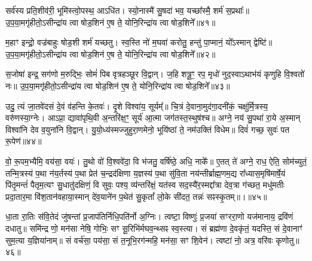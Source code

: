 {\anuvakamend[{असा॑वि स॒प्तविꣳ॑शतिः॥39॥}]}

सर्व॑स्य प्रति॒शीव॑री॒ भूमि॑स्त्वो॒पस्थ॒ आ\-ऽधि॑त। स्यो॒नास्मै॑ सु॒षदा॑ भव॒ यच्छा᳚स्मै॒ शर्म॑ स॒प्रथाः᳚॥ उ॒प॒या॒मगृ॑हीतो॒\-ऽसीन्द्रा॑य त्वा षोड॒शिन॑ ए॒ष ते॒ योनि॒रिन्द्रा॑य त्वा षोड॒शिने᳚॥४१॥

{\anuvakamend[{सर्व॑स्य॒ षड्विꣳ॑शतिः॥40॥}]}

म॒हाꣳ इन्द्रो॒ वज्र॑बाहुः षोड॒शी शर्म॑ यच्छतु। स्व॒स्ति नो॑ म॒घवा॑ करोतु॒ हन्तु॑ पा॒प्मानं॒ यो᳚\-ऽस्मान् द्वेष्टि॑॥ उ॒प॒या॒मगृ॑हीतो॒\-ऽसीन्द्रा॑य त्वा षोड॒शिन॑ ए॒ष ते॒ योनि॒रिन्द्रा॑य त्वा षोड॒शिने᳚॥४२॥

{\anuvakamend[{सर्व॑स्य म॒हान्थ्षड्विꣳ॑शति॒ष्षड्विꣳ॑शतिः॥41॥}]}

स॒जोषा॑ इन्द्र॒ सग॑णो म॒रुद्भिः॒ सोमं॑ पिब वृत्रहञ्छूर वि॒द्वान्। ज॒हि शत्रू॒ꣳ॒ रप॒ मृधो॑ नुद॒स्वा\-ऽथाभ॑यं कृणुहि वि॒श्वतो॑ नः॥ उ॒प॒या॒मगृ॑हीतो॒\-ऽसीन्द्रा॑य त्वा षोड॒शिन॑ ए॒ष ते॒ योनि॒रिन्द्रा॑य त्वा षोड॒शिने᳚॥४३॥

{\anuvakamend[{स॒जोषा᳚स्त्रि॒ꣳ॒शत्॥42॥}]}

उदु॒ त्यं जा॒तवे॑दसं दे॒वं व॑हन्ति के॒तवः॑। दृ॒शे विश्वा॑य॒ सूर्यम्᳚॥ चि॒त्रं दे॒वाना॒मुद॑गा॒दनी॑कं॒ चक्षु॑र्मि॒त्रस्य॒ वरु॑णस्या॒ग्नेः। आ\-ऽप्रा॒ द्यावा॑पृथि॒वी अ॒न्तरि॑क्ष॒ꣳ॒ सूर्य॑ आ॒त्मा जग॑तस्त॒स्थुष॑श्च॥ अग्ने॒ नय॑ सु॒पथा॑ रा॒ये अ॒स्मान् विश्वा॑नि देव व॒युना॑नि वि॒द्वान्। यु॒यो॒ध्य॑स्मज्जुहुरा॒णमेनो॒ भूयि॑ष्ठां ते॒ नम॑उक्तिं विधेम॥ दिवं॑ गच्छ॒ सुवः॑ पत रू॒पेण॑॥४४॥

वो॒ रू॒पम॒भ्यैमि॒ वय॑सा॒ वयः॑। तु॒थो वो॑ वि॒श्ववे॑दा॒ वि भ॑जतु॒ वर्\mbox{}षि॑ष्ठे॒ अधि॒ नाके᳚॥ ए॒तत् ते॑ अग्ने॒ राध॒ ऐति॒ सोम॑च्युतं॒ तन्मि॒त्रस्य॑ प॒था न॑य॒र्तस्य॑ प॒था प्रेत॑ च॒न्द्रद॑क्षिणा य॒ज्ञस्य॑ प॒था सु॑वि॒ता नय॑न्तीर्ब्राह्म॒णम॒द्य रा᳚ध्यास॒मृषि॑मार्\mbox{}षे॒यं पि॑तृ॒मन्तं॑ पैतृम॒त्यꣳ सु॒धातु॑दक्षिणं॒ वि सुवः॒ पश्य॒ व्य॑न्तरि॑क्षं॒ यत॑स्व सद॒स्यै॑र॒स्मद्दा᳚त्रा देव॒त्रा ग॑च्छत॒ मधु॑मतीः प्रदा॒तार॒मा वि॑श॒तान॑वहाया॒स्मान् दे॑व॒याने॑न प॒थेत॑ सु॒कृतां᳚ लो॒के सी॑दत॒ तन्नः॑ सꣴस्कृ॒तम्॥।॥४५॥

{\anuvakamend[{रू॒पेण॑ सद॒स्यै॑र॒ष्टाद॑श च॥43 (37)॥}]}

धा॒ता रा॒तिः स॑वि॒तेदं जु॑षन्तां प्र॒जाप॑तिर्निधि॒पति॑र्नो अ॒ग्निः। त्वष्टा॒ विष्णुः॑ प्र॒जया॑ सꣳररा॒णो यज॑मानाय॒ द्रवि॑णं दधातु॥ समि॑न्द्र णो॒ मन॑सा नेषि॒ गोभिः॒ सꣳ सू॒रिभि॑र्मघव॒न्थ्सꣴ स्व॒स्त्या। सं ब्रह्म॑णा दे॒वकृ॑तं॒ यदस्ति॒ सं दे॒वानाꣳ॑ सुम॒त्या य॒ज्ञिया॑नाम्॥ सं वर्च॑सा॒ पय॑सा॒ सं त॒नूभि॒रग॑न्महि॒ मन॑सा॒ सꣳ शि॒वेन॑। त्वष्टा॑ नो॒ अत्र॒ वरि॑वः कृणोतु॥४६॥

